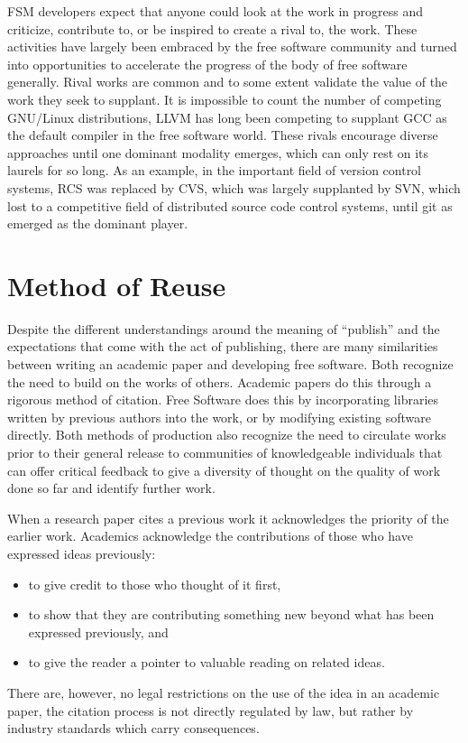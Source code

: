 \documentclass[
	fontsize=10pt, %
	twoside=false, %
	secnumdepth=1, %
]{kaobook}
\begin{document}
FSM developers expect that anyone could look at the work in progress
and criticize, contribute to, or be inspired to create a rival to, the
work. These activities have largely been embraced by the free software
community and turned into opportunities to accelerate the progress of
the body of free software generally. Rival works are common and to
some extent validate the value of the work they seek to supplant. It
is impossible to count the number of competing GNU/Linux
distributions, LLVM has long been competing to supplant GCC as the
default compiler in the free software world. These rivals encourage
diverse approaches until one dominant modality emerges, which can only
rest on its laurels for so long. As an example, in the important field
of version control systems, RCS was replaced by CVS, which was largely
supplanted by SVN, which lost to a competitive field of distributed
source code control systems, until git as emerged as the dominant
player.

\section{Method of Reuse}

Despite the different understandings around the meaning of “publish”
and the expectations that come with the act of publishing, there are
many similarities between writing an academic paper and developing
free software. Both recognize the need to build on the works of
others. Academic papers do this through a rigorous method of
citation. Free Software does this by incorporating libraries written
by previous authors into the work, or by modifying existing software
directly. Both methods of production also recognize the need to
circulate works prior to their general release to communities of
knowledgeable individuals that can offer critical feedback to give a
diversity of thought on the quality of work done so far and identify
further work.

When a research paper cites a previous work it acknowledges the priority of the earlier work. Academics acknowledge the contributions of those who have expressed ideas previously:
\begin{itemize}
\item to give credit to those who thought of it first,
\item to show that they are contributing something new beyond what has been expressed previously, and
\item to give the reader a pointer to valuable reading on related ideas.
\end{itemize}
There are, however, no legal restrictions on the use of the idea in an
academic paper, the citation process is not directly regulated by law,
but rather by industry standards which carry consequences.
\end{document}
